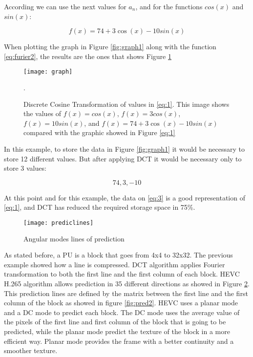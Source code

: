 \documentclass[10pt,journal,compsoc]{IEEEtran}
\begin{document}
According \cite{jpeg} we can use the next values for $a_n$, and for the functions $cos(x)$ and $ sin(x)$:

\begin{equation}
f(x)=74+3\cos(x)-10sin(x)\label{eq:furier2}
\end{equation}


When plotting the graph in Figure \ref{fig:graph1} along with the function \eqref{eq:furier2}, the results are the ones that shows Figure \ref{fig:graph2}

\begin{figure}[h!]
\texttt{[image: graph]}
\caption{Discrete Cosine Transformation of values in \eqref{eq:1}. This image shows the values of $f(x)=cos(x)$, $f(x)=3cos(x)$, $f(x)=10sin(x)$, and $f(x)=74+3\cos(x)-10sin(x)$ compared with the graphic showed in Figure \eqref{eq:1}}.
\label{fig:graph2}
\end{figure}


In this example, to store the data in Figure \ref{fig:graph1} it would be necessary to store 12 different values. But after applying DCT it would be necessary only to store 3 values:

\begin{equation}
 74, 3, -10\label{eq:3}
\end{equation}

At this point and for this example, the data on \eqref{eq:3} is a good representation of \eqref{eq:1}, and DCT has reduced the required storage space in 75\%. 


\begin{figure}[h!]
\texttt{[image: prediclines]}
\caption{Angular modes lines of prediction \cite{accel}}
\label{fig:pred1}
\end{figure}

As stated before, a PU is a block that goes from 4x4 to 32x32. The previous example showed how a line is compressed. DCT algorithm applies Fourier transformation to both the first line and the first column of each block. HEVC H.265 algorithm allows prediction in 35 different directions as showed in Figure \ref{fig:pred1}. This prediction lines are defined by the matrix between the first line and the first column of the block as showed in figure \ref{fig:pred2}. HEVC uses a planar mode and a DC mode to predict each block. The DC mode uses the average value of the pixels of the first line and first column of the block that is going to be predicted, while the planar mode predict the texture of the block in a more efficient way. Planar mode provides the frame with a better continuity and a smoother texture. \cite{modes}
\end{document}
